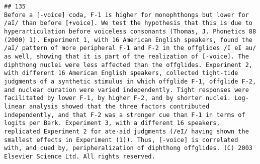 \documentclass[
  english,
  man]{apa6}
\begin{document}
\begin{verbatim}
## 135                                                                                                                                                                                                                                                                                                                                                                                                                                                                                                                                                                                                                                                                                                                                                                                                                                                                                                                                                                                                                                                                                                                                                                                                                                                                                                                                                                                                                           Before a [-voice] coda, F-1 is higher for monophthongs but lower for /aI/ than before [+voice]. We test the hypothesis that this is due to hyperarticulation before voiceless consonants (Thomas, J. Phonetics 88 (2000) 1). Experiment 1, with 16 American English speakers, found the /aI/ pattern of more peripheral F-1 and F-2 in the offglides /I eI au/ as well, showing that it is part of the realization of [-voice]. The diphthong nuclei were less affected than the offglides. Experiment 2, with different 16 American English speakers, collected tight-tide judgments of a synthetic stimulus in which offglide F-1, offglide F-2, and nuclear duration were varied independently. Tight responses were facilitated by lower F-1, by higher F-2, and by shorter nuclei. Log-linear analysis showed that the three factors contributed independently, and that F-2 was a stronger cue than F-1 in terms of logits per Bark. Experiment 3, with a different 16 speakers, replicated Experiment 2 for ate-aid judgments (/eI/ having shown the smallest effects in Experiment (1)). Thus, [-voice] is correlated with, and cued by, peripheralization of diphthong offglides. (C) 2003 Elsevier Science Ltd. All rights reserved.

\end{verbatim}
\end{document}
